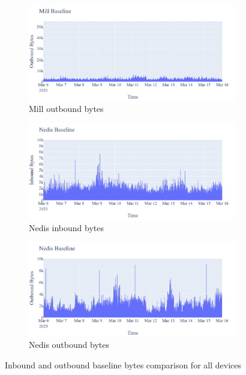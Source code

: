 \begin{figure}[H]
\begin{subfigure}[b]{0.4\textwidth}
    \end{subfigure}
    \begin{subfigure}[b]{0.4\textwidth}
        \includegraphics[width=\textwidth]{figures/Mill_Baseline_OutboundBytes.png}
        \caption{Mill outbound bytes}
    \end{subfigure}
    \begin{subfigure}[b]{0.4\textwidth}
        \includegraphics[width=\textwidth]{figures/Nedis_Baseline_InboundBytes.png}
        \caption{Nedis inbound bytes}
    \end{subfigure}
    \begin{subfigure}[b]{0.4\textwidth}
        \includegraphics[width=\textwidth]{figures/Nedis_Baseline_OutboundBytes.png}
        \caption{Nedis outbound bytes}
    \end{subfigure}
    \caption{Inbound and outbound baseline bytes comparison for all devices}
    \label{Fig:CompareBaselineOutandInboundBytes}
 \end{figure}

